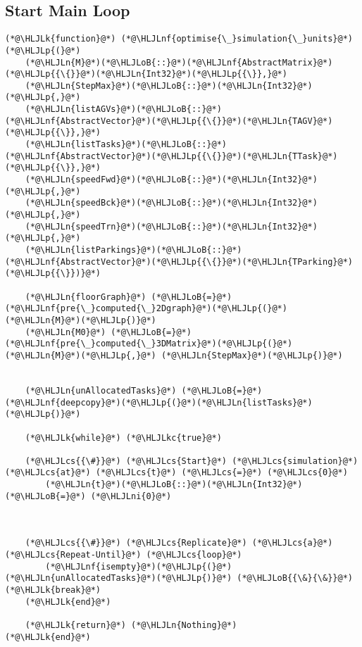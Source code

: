 \documentclass[12pt,a4paper]{article}
\newcommand{\HLJLk}[1]{\textcolor[RGB]{148,91,176}{\textbf{#1}}}
\newcommand{\HLJLkc}[1]{\textcolor[RGB]{59,151,46}{\textit{#1}}}
\newcommand{\HLJLn}[1]{#1}
\newcommand{\HLJLnf}[1]{\textcolor[RGB]{66,102,213}{#1}}
\newcommand{\HLJLni}[1]{\textcolor[RGB]{59,151,46}{#1}}
\newcommand{\HLJLoB}[1]{\textcolor[RGB]{102,102,102}{\textbf{#1}}}
\newcommand{\HLJLp}[1]{#1}
\newcommand{\HLJLcs}[1]{\textcolor[RGB]{153,153,119}{\textit{#1}}}
\begin{document}
\subsection{Start Main Loop}

\begin{lstlisting}
(*@\HLJLk{function}@*) (*@\HLJLnf{optimise{\_}simulation{\_}units}@*)(*@\HLJLp{(}@*)
    (*@\HLJLn{M}@*)(*@\HLJLoB{::}@*)(*@\HLJLnf{AbstractMatrix}@*)(*@\HLJLp{{\{}}@*)(*@\HLJLn{Int32}@*)(*@\HLJLp{{\}},}@*)
    (*@\HLJLn{StepMax}@*)(*@\HLJLoB{::}@*)(*@\HLJLn{Int32}@*)(*@\HLJLp{,}@*)
    (*@\HLJLn{listAGVs}@*)(*@\HLJLoB{::}@*)(*@\HLJLnf{AbstractVector}@*)(*@\HLJLp{{\{}}@*)(*@\HLJLn{TAGV}@*)(*@\HLJLp{{\}},}@*)
    (*@\HLJLn{listTasks}@*)(*@\HLJLoB{::}@*)(*@\HLJLnf{AbstractVector}@*)(*@\HLJLp{{\{}}@*)(*@\HLJLn{TTask}@*)(*@\HLJLp{{\}},}@*)
    (*@\HLJLn{speedFwd}@*)(*@\HLJLoB{::}@*)(*@\HLJLn{Int32}@*)(*@\HLJLp{,}@*)
    (*@\HLJLn{speedBck}@*)(*@\HLJLoB{::}@*)(*@\HLJLn{Int32}@*)(*@\HLJLp{,}@*)
    (*@\HLJLn{speedTrn}@*)(*@\HLJLoB{::}@*)(*@\HLJLn{Int32}@*)(*@\HLJLp{,}@*)
    (*@\HLJLn{listParkings}@*)(*@\HLJLoB{::}@*)(*@\HLJLnf{AbstractVector}@*)(*@\HLJLp{{\{}}@*)(*@\HLJLn{TParking}@*)(*@\HLJLp{{\}})}@*)

    (*@\HLJLn{floorGraph}@*) (*@\HLJLoB{=}@*) (*@\HLJLnf{pre{\_}computed{\_}2Dgraph}@*)(*@\HLJLp{(}@*)(*@\HLJLn{M}@*)(*@\HLJLp{)}@*)
    (*@\HLJLn{M0}@*) (*@\HLJLoB{=}@*) (*@\HLJLnf{pre{\_}computed{\_}3DMatrix}@*)(*@\HLJLp{(}@*)(*@\HLJLn{M}@*)(*@\HLJLp{,}@*) (*@\HLJLn{StepMax}@*)(*@\HLJLp{)}@*)


    (*@\HLJLn{unAllocatedTasks}@*) (*@\HLJLoB{=}@*) (*@\HLJLnf{deepcopy}@*)(*@\HLJLp{(}@*)(*@\HLJLn{listTasks}@*)(*@\HLJLp{)}@*)

    (*@\HLJLk{while}@*) (*@\HLJLkc{true}@*)

    (*@\HLJLcs{{\#}}@*) (*@\HLJLcs{Start}@*) (*@\HLJLcs{simulation}@*) (*@\HLJLcs{at}@*) (*@\HLJLcs{t}@*) (*@\HLJLcs{=}@*) (*@\HLJLcs{0}@*)
        (*@\HLJLn{t}@*)(*@\HLJLoB{::}@*)(*@\HLJLn{Int32}@*) (*@\HLJLoB{=}@*) (*@\HLJLni{0}@*)



    (*@\HLJLcs{{\#}}@*) (*@\HLJLcs{Replicate}@*) (*@\HLJLcs{a}@*) (*@\HLJLcs{Repeat-Until}@*) (*@\HLJLcs{loop}@*)
        (*@\HLJLnf{isempty}@*)(*@\HLJLp{(}@*)(*@\HLJLn{unAllocatedTasks}@*)(*@\HLJLp{)}@*) (*@\HLJLoB{{\&}{\&}}@*) (*@\HLJLk{break}@*)
    (*@\HLJLk{end}@*)

    (*@\HLJLk{return}@*) (*@\HLJLn{Nothing}@*)
(*@\HLJLk{end}@*)
\end{lstlisting}
\end{document}
